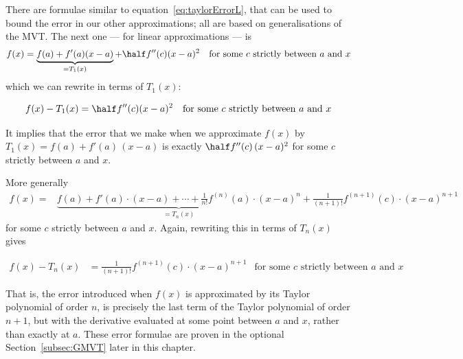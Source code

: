 \begin{eg}
\end{eg}

There are formulae similar to equation~\eqref{eq:taylorErrorL}, that can be used to bound
the error in our other approximations; all are based on generalisations of the
MVT. The
next one --- for linear approximations --- is
\begin{align*}
f(x) & =\underbrace{f(a)+f'(a)(x-a)}_{=T_1(x)}+\half f''(c)(x-a)^2 &
\text{for some $c$ strictly between $a$ and $x$}
\end{align*}
which we can rewrite in terms of $T_1(x)$:
\begin{impeqn}\label{eq:taylorErrorQ}
\begin{align*}
f(x)-T_1(x) &=  \half f''(c)(x-a)^2 & \text{for some $c$ strictly between $a$ and $x$}
\end{align*}
\end{impeqn}
It implies that the error that we make when we approximate $f(x)$ by
$T_1(x) = f(a)+f'(a)\,(x-a)$ is exactly $\half f''(c)\,(x-a)^2$ for some $c$ strictly
between $a$ and $x$.


More generally
\begin{align*}
f(x)=&
\underbrace{f(a)+f'(a)\cdot(x-a)+\cdots+\frac{1}{n!}f^{(n)}(a)\cdot(x-a)^n}_{= T_n(x)}
+\frac{1}{(n+1)!}f^{(n+1)}(c)\cdot (x-a)^{n+1}
\end{align*}
for some $c$ strictly between $a$ and $x$. Again, rewriting this in terms of $T_n(x)$
gives
\begin{impeqn}\label{eq:taylorErrorN}
\begin{align*}
  f(x) - T_n(x) &= \frac{1}{(n+1)!}f^{(n+1)}(c)\cdot (x-a)^{n+1}
& \text{for some $c$ strictly between $a$ and $x$}
\end{align*}
\end{impeqn}

That is, the error introduced when $f(x)$ is approximated by its Taylor
polynomial of order $n$, is precisely the last term of the Taylor polynomial
of order $n+1$, but with the derivative evaluated at some point between
$a$ and $x$, rather than exactly at $a$. These error formulae are proven
in the optional Section~\ref{subsec:GMVT} later in this chapter.


